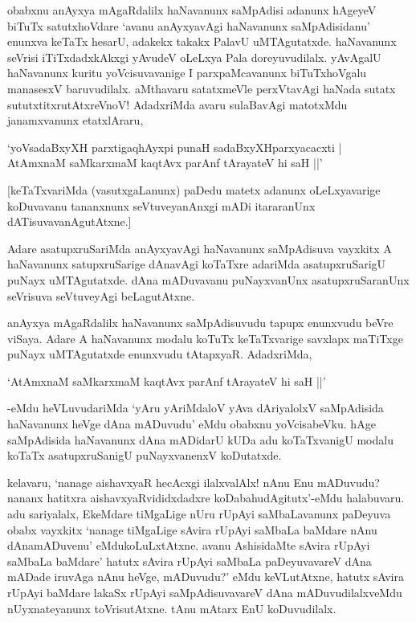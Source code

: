 obabxnu anAyxya mAgaRdalilx haNavanunx saMpAdisi adanunx hAgeyeV biTuTx satutxhoVdare `avanu anAyxyavAgi haNavanunx saMpAdisidanu' enunxva keTaTx hesarU, adakekx takakx PalavU uMTAgutatxde. haNavanunx seVrisi iTiTxdadxkAkxgi yAvudeV oLeLxya Pala doreyuvudilalx. yAvAgalU haNavanunx kuritu yoVcisuvavanige I parxpaMcavanunx biTuTxhoVgalu manasesxV baruvudilalx. aMthavaru satatxmeVle perxVtavAgi haNada sutatx sututxtitxrutAtxreVnoV! AdadxriMda avaru sulaBavAgi matotxMdu janamxvanunx etatxlAraru,

\begin{shloka}
`yoV\s sadaBxyXH parxtigaqhAyxpi punaH sadaBxyXHparxyacacxti |\\
AtAmxnaM saMkarxmaM kaqtAvx parAnf tArayateV hi saH ||'
\end{shloka}

[keTaTxvariMda (vasutxgaLanunx) paDedu matetx adanunx oLeLxyavarige koDuvavanu tananxnunx seVtuveyanAnxgi mADi itararanUnx dATisuvavanAgutAtxne.]

Adare asatupxruSariMda anAyxyavAgi haNavanunx saMpAdisuva vayxkitx A haNavanunx satupxruSarige dAnavAgi koTaTxre adariMda asatupxruSarigU puNayx uMTAgutatxde. dAna mADuvavanu puNayxvanUnx asatupxruSaranUnx seVrisuva seVtuveyAgi beLagutAtxne.

anAyxya mAgaRdalilx haNavanunx saMpAdisuvudu tapupx enunxvudu beVre viSaya. Adare A haNavanunx modalu koTuTx keTaTxvarige savxlapx maTiTxge puNayx uMTAgutatxde enunxvudu tAtapxyaR. AdadxriMda,

\begin{shloka}
`AtAmxnaM saMkarxmaM kaqtAvx parAnf tArayateV hi saH ||'
\end{shloka}

-eMdu heVLuvudariMda `yAru yAriMdaloV yAva dAriyalolxV saMpAdisida haNavanunx heVge dAna mADuvudu' eMdu obabxnu yoVcisabeVku. hAge saMpAdisida haNavanunx dAna mADidarU kUDa adu koTaTxvanigU modalu koTaTx asatupxruSanigU puNayxvanenxV koDutatxde.

kelavaru, `nanage aishavxyaR hecAcxgi ilalxvalAlx! nAnu Enu mADuvudu? nananx hatitxra aishavxyaRvididxdadxre koDabahudAgitutx'-eMdu halabuvaru. adu sariyalalx, EkeMdare tiMgaLige nUru rUpAyi saMbaLavanunx paDeyuva obabx vayxkitx `nanage tiMgaLige sAvira rUpAyi saMbaLa baMdare nAnu dAnamADuvenu' eMdukoLuLxtAtxne. avanu AshisidaMte sAvira rUpAyi saMbaLa baMdare' hatutx sAvira rUpAyi saMbaLa paDeyuvavareV dAna mADade iruvAga nAnu heVge, mADuvudu?' eMdu keVLutAtxne, hatutx sAvira rUpAyi baMdare lakaSx rUpAyi saMpAdisuvavareV dAna mADuvudilalxveMdu nUyxnateyanunx toVrisutAtxne. tAnu mAtarx EnU koDuvudilalx.

